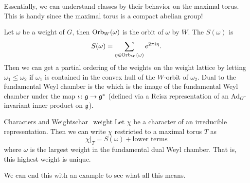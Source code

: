 Essentially, we can understand classes by their behavior on the maximal torus.  This is handy since the maximal torus is a compact abelian group! 

Let $\omega$ be a weight of $G$, then $\mathrm{Orb}_W(\omega)$ is the orbit of $\omega$ by $W$. The  $S(\omega)$ is 
\[
S(\omega)=\sum_{\eta \in \mathrm{Orb}_W(\omega)}e^{2\pi i \eta}.
\]
Then we can get a partial ordering of the weights on the weight lattice by letting $\omega_1 \leq \omega_2$ if $\omega_1$ is contained in the convex hull of the $W$-orbit of $\omega_2$. Dual to the fundamental Weyl chamber is the  which is the image of the fundamental Weyl chamber under the map $\iota \colon \mathfrak{g} \to \mathfrak{g}^*$ (defined via a Reisz representation of an $\mathrm{Ad}_G$-invariant inner product on $\mathfrak{g}$).    
\begin{prop}{Characters and Weights}{char_weight}
    Let $\chi$ be a character of an irreducible representation. Then we can write $\chi$ restricted to a maximal torus $T$ as 
    \[
    \chi\vert_T = S(\omega) + \textrm{lower terms}
    \]
    where $\omega$ is the largest weight in the fundamental dual Weyl chamber. That is, this highest weight is unique.
\end{prop}

We can end this with an example to see what all this means.

